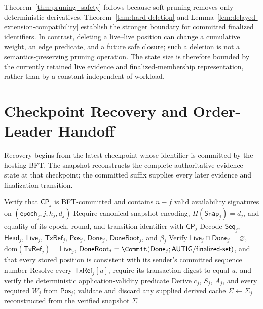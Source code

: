 Theorem~\ref{thm:pruning_safety} follows because soft pruning removes only
deterministic derivatives.  Theorem~\ref{thm:hard-deletion} and
Lemma~\ref{lem:delayed-extension-compatibility} establish the stronger boundary
for committed finalized identifiers.  In contrast, deleting a live--live
position can change a cumulative weight, an edge predicate, and a future safe
closure; such a deletion is not a semantics-preserving pruning operation.
The state size is therefore bounded by the currently retained live evidence
and finalized-membership representation, rather than by a constant independent
of workload.

\section{Checkpoint Recovery and Order-Leader Handoff}
\label{app:checkpoint-handoff}

Recovery begins from the latest checkpoint whose identifier is committed by
the hosting BFT.  The snapshot reconstructs the complete authoritative
evidence state at that checkpoint; the committed suffix supplies every later
evidence and finalization transition.

\begin{algorithm}[h!]
\caption{\textsc{RecoverState}: Checkpoint Recovery and Committed Replay}
\label{alg:recover-state}
\footnotesize
{}
Verify that $\mathsf{CP}_j$ is BFT-committed and contains $n-f$ valid
availability signatures on $(\mathsf{epoch}_j,j,h_j,d_j)$\;
Require canonical snapshot encoding, $H(\mathsf{Snap}_j)=d_j$, and equality of
its epoch, round, and transition identifier with $\mathsf{CP}_j$\;
Decode $\mathsf{Seq}_j$, $\mathsf{Head}_j$, $\mathsf{Live}_j$,
$\mathsf{TxRef}_j$, $\mathsf{Pos}_j$, $\mathsf{Done}_j$,
$\mathsf{DoneRoot}_j$, and $\beta_j$\;
Verify $\mathsf{Live}_j\cap\mathsf{Done}_j=\varnothing$,
$\mathrm{dom}(\mathsf{TxRef}_j)=\mathsf{Live}_j$,
$\mathsf{DoneRoot}_j=\Commit(\mathsf{Done}_j;
\mathsf{AUTIG/finalized\mbox{-}set})$, and that every stored position is
consistent with its sender's committed sequence number\;
Resolve every $\mathsf{TxRef}_j[u]$, require its transaction digest to equal
$u$, and verify the deterministic application-validity predicate\;
Derive $c_j$, $S_j$, $A_j$, and every required $W_j$ from
$\mathsf{Pos}_j$; validate and discard any supplied derived cache\;
$\Sigma\gets\Sigma_j$ reconstructed from the verified snapshot\;
\KwRet $\Sigma$
\end{algorithm}

